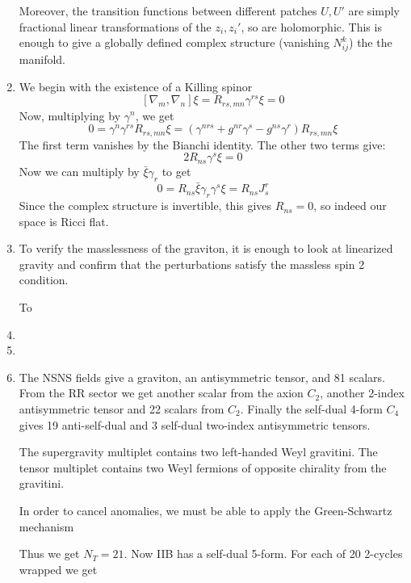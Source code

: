 \documentclass[11pt, class=article, crop=false]{standalone}
\begin{document}
\begin{enumerate}
	Moreover, the transition functions between different patches $U, U'$ are simply fractional linear transformations of the $z_i, z_i'$, so are holomorphic. This is enough to give a globally defined complex structure (vanishing $N_{ij}^k$) the the manifold. 
	
	\item We begin with the existence of a Killing spinor 
	\[
		[\nabla_m, \nabla_n]\xi = R_{rs, mn} \gamma^{rs} \xi  =0
	\]
	Now, multiplying by $\gamma^n$, we get
	\[
		0 = \gamma^{n} \gamma^{rs} R_{rs, mn} \xi = (\gamma^{nrs} + g^{nr} \gamma^s - g^{ns} \gamma^r) R_{rs, mn} \xi 
	\]
	The first term vanishes by the Bianchi identity. The other two terms give:
	\[
		2 R_{ns} \gamma^s \xi = 0
	\]
	Now we can multiply by $\bar \xi \gamma_r$ to get
	\[
		0 = R_{ns} \bar \xi \gamma_r \gamma^s \xi = R_{ns} J^r_s
	\]
	Since the complex structure is invertible, this gives $R_{ns} = 0$, so indeed our space is Ricci flat.
	
	\item To verify the masslessness of the graviton, it is enough to look at linearized gravity and confirm that the perturbations satisfy the massless spin 2 condition. 
	
	To
	
	\item 
	
	\item 
	
	\item The NSNS fields give a graviton, an antisymmetric tensor, and 81 scalars. From the RR sector we get another scalar from the axion $C_2$, another 2-index antisymmetric tensor and 22 scalars from $C_2$. Finally the self-dual 4-form $C_4$ gives 19 anti-self-dual and 3 self-dual two-index antisymmetric tensors. 
	
	The supergravity multiplet contains two left-handed Weyl gravitini. The tensor multiplet contains two Weyl fermions of opposite chirality from the gravitini. 
	
	In order to cancel anomalies, we must be able to apply the Green-Schwartz mechanism
	
	Thus we get $N_{T} = 21$. Now IIB has a self-dual 5-form. For each of 20 2-cycles wrapped we get 
	
	
	
\end{enumerate}

\end{document}

